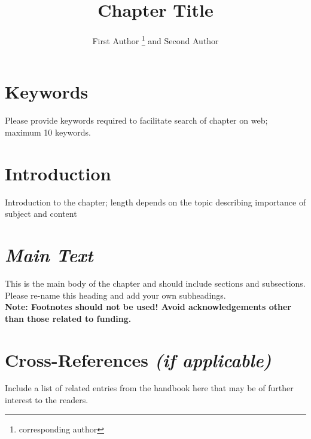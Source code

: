 \documentclass[graybox, nosecnum]{svmult}
\begin{document}
\title*{Chapter Title}
\author{First Author \thanks{corresponding author} and Second Author}
%
%
\maketitle
%
\section{Keywords} 
Please provide keywords required to facilitate search of chapter on web; maximum 10 keywords.
\section{Introduction}
Introduction to the chapter; length depends on the topic describing importance of subject and content

\section{\textit{Main Text}}
This is the main body of the chapter and should include sections and subsections. Please re-name this heading and add your own subheadings.\\
{\bf Note: Footnotes should not be used! Avoid acknowledgements other than those related to funding.}
\section{Cross-References \textit{(if applicable)}}
Include a list of related entries from the handbook here that may be of further interest to the readers.
\end{document}
